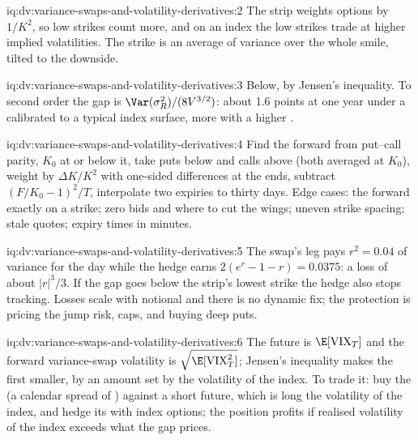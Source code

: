 \begin{solution}{iq:dv:variance-swaps-and-volatility-derivatives:2}
The strip weights options by $1/K^2$, so low strikes count more, and on an index the low strikes trade at higher
implied volatilities. The strike is an average of variance over the whole smile, tilted to the downside.
\end{solution}

\begin{solution}{iq:dv:variance-swaps-and-volatility-derivatives:3}
Below, by Jensen's inequality. To second order the gap is $\Var(\sigma_R^2)/(8V^{3/2})$: about 1.6 points at one year
under a  calibrated to a typical index surface, more with a higher .
\end{solution}

\begin{solution}{iq:dv:variance-swaps-and-volatility-derivatives:4}
Find the forward from put--call parity, $K_0$ at or below it, take puts below and calls above (both averaged at
$K_0$), weight by $\Delta K/K^2$ with one-sided differences at the ends, subtract $(F/K_0-1)^2/T$, interpolate two
expiries to thirty days. Edge cases: the forward exactly on a strike; zero bids and where to cut the wings; uneven
strike spacing; stale quotes; expiry times in minutes.
\end{solution}

\begin{solution}{iq:dv:variance-swaps-and-volatility-derivatives:5}
The swap's leg pays $r^2=0.04$ of variance for the day while the hedge earns $2(e^r-1-r)=0.0375$: a loss of about
$|r|^3/3$. If the gap goes below the strip's lowest strike the hedge also stops tracking. Losses scale with notional
and there is no dynamic fix; the protection is pricing the jump risk, caps, and buying deep puts.
\end{solution}

\begin{solution}{iq:dv:variance-swaps-and-volatility-derivatives:6}
The future is $\E[\mathrm{VIX}_T]$ and the forward variance-swap volatility is $\sqrt{\E[\mathrm{VIX}_T^2]}$; Jensen's
inequality makes the first smaller, by an amount set by the volatility of the index. To trade it: buy the  (a calendar spread of ) against a short future, which is long the volatility of the index,
and hedge its  with index options; the position profits if realised volatility of the index exceeds what the
gap prices.
\end{solution}
